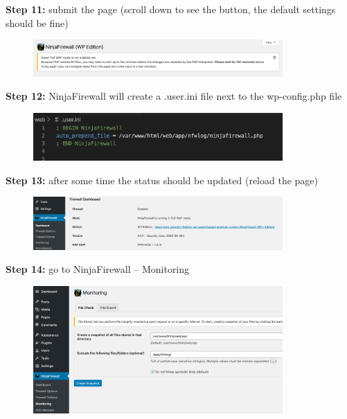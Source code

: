 \documentclass[a4paper]{article}
\begin{document}
\noindent
\textbf{Step 11:} submit the page (scroll down to see the button, the default settings should be fine)

\begin{figure}[H]
  \centering
  \includegraphics[width=0.85\textwidth]{images/12.png}
\end{figure}

\noindent
\textbf{Step 12:} NinjaFirewall will create a .user.ini file next to the wp-config.php file

\begin{figure}[H]
  \centering
  \includegraphics[width=0.85\textwidth]{images/13.png}
\end{figure}

\newpage

\noindent
\textbf{Step 13:} after some time the status should be updated (reload the page)

\begin{figure}[H]
  \centering
  \includegraphics[width=0.85\textwidth]{images/14.png}
\end{figure}

\noindent
\textbf{Step 14:} go to NinjaFirewall -- Monitoring

\begin{figure}[H]
  \centering
  \includegraphics[width=0.85\textwidth]{images/15.png}
\end{figure}
\end{document}
